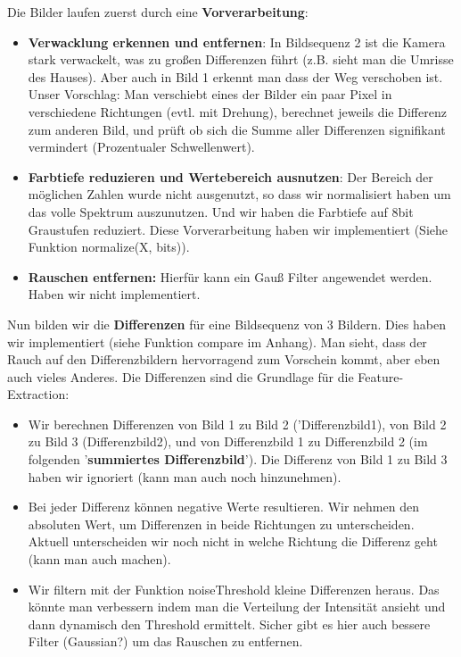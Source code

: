 \documentclass{article}
\begin{document}
Die Bilder laufen zuerst durch eine \textbf{Vorverarbeitung}:

\begin{itemize}
\item \textbf{Verwacklung erkennen und entfernen}: In Bildsequenz 2 ist die Kamera stark verwackelt, was zu großen Differenzen führt (z.B. sieht man die Umrisse des Hauses). Aber auch in Bild 1 erkennt man dass der Weg verschoben ist. Unser Vorschlag: Man verschiebt eines der Bilder ein paar Pixel in verschiedene Richtungen (evtl. mit Drehung), berechnet jeweils die Differenz zum anderen Bild, und prüft ob sich die Summe aller Differenzen signifikant vermindert (Prozentualer Schwellenwert).
\item \textbf{Farbtiefe reduzieren und Wertebereich ausnutzen}: Der Bereich der möglichen Zahlen wurde nicht ausgenutzt, so dass wir normalisiert haben um das volle Spektrum auszunutzen. Und wir haben die Farbtiefe auf 8bit Graustufen reduziert. Diese Vorverarbeitung haben wir implementiert (Siehe Funktion normalize(X, bits)).
\item \textbf{Rauschen entfernen:} Hierfür kann ein Gauß Filter angewendet werden. Haben wir nicht implementiert.
\end{itemize}

Nun bilden wir die \textbf{Differenzen} für eine Bildsequenz von 3 Bildern. Dies haben wir implementiert (siehe Funktion compare im Anhang). Man sieht, dass der Rauch auf den Differenzbildern hervorragend zum Vorschein kommt, aber eben auch vieles Anderes. Die Differenzen sind die Grundlage für die Feature-Extraction:
\begin{itemize}
\item Wir berechnen Differenzen von Bild 1 zu Bild 2 ('Differenzbild1), von Bild 2 zu Bild 3 (Differenzbild2), und von Differenzbild 1 zu Differenzbild 2 (im folgenden '\textbf{summiertes Differenzbild}'). Die Differenz von Bild 1 zu Bild 3 haben wir ignoriert (kann man auch noch hinzunehmen).
\item Bei jeder Differenz können negative Werte resultieren. Wir nehmen den absoluten Wert, um Differenzen in beide Richtungen zu unterscheiden. Aktuell unterscheiden wir noch nicht in welche Richtung die Differenz geht (kann man auch machen).
\item Wir filtern mit der Funktion noiseThreshold kleine Differenzen heraus. Das könnte man verbessern indem man die Verteilung der Intensität ansieht und dann dynamisch den Threshold ermittelt. Sicher gibt es hier auch bessere Filter (Gaussian?) um das Rauschen zu entfernen.
\end{itemize}
\end{document}
